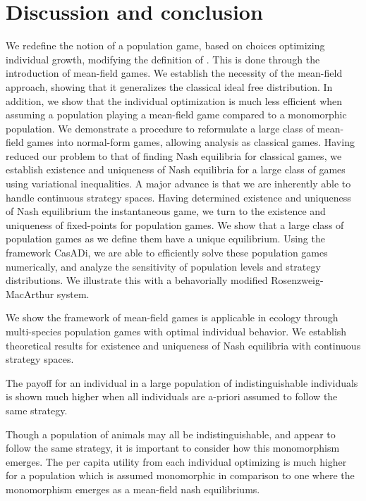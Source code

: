 \section{Discussion and conclusion}


We redefine the notion of a population game, based on choices optimizing individual growth, modifying the definition of \citep{vincent2005evolutionary}. This is done through the introduction of mean-field games. We establish the necessity of the mean-field approach, showing that it generalizes the classical ideal free distribution. In addition, we show that the individual optimization is much less efficient when assuming a population playing a mean-field game compared to a monomorphic population. We demonstrate a procedure to reformulate a large class of mean-field games into normal-form games, allowing analysis as classical games. Having reduced our problem to that of finding Nash equilibria for classical games, we establish existence and uniqueness of Nash equilibria for a large class of games using variational inequalities. A major advance is that we are inherently able to handle continuous strategy spaces. Having determined existence and uniqueness of Nash equilibrium the instantaneous game, we turn to the existence and uniqueness of fixed-points for population games. We show that a large class of population games as we define them have a unique equilibrium.
Using the framework CasADi, we are able to efficiently solve these population games numerically, and analyze the sensitivity of population levels and strategy distributions. We illustrate this with a behavorially modified Rosenzweig-MacArthur system.

We show the framework of mean-field games is applicable in ecology through multi-species population games with optimal individual behavior. We establish theoretical results for existence and uniqueness of Nash equilibria with continuous strategy spaces.

The payoff for an individual in a large population of indistinguishable individuals is shown much higher when all individuals are a-priori assumed to follow the same strategy.

Though a population of animals may all be indistinguishable, and appear to follow the same strategy, it is important to consider how this monomorphism emerges. The per capita utility from each individual optimizing is much higher for a population which is assumed monomorphic in comparison to one where the monomorphism emerges as a mean-field nash equilibriums.

